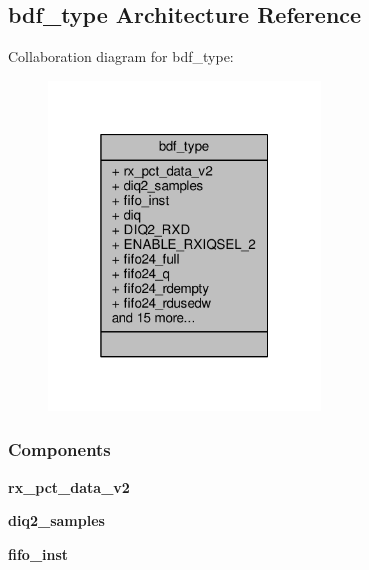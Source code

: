 \subsection{bdf\+\_\+type Architecture Reference}
\label{classLTE__rx__path_1_1bdf__type}


Collaboration diagram for bdf\+\_\+type\+:\nopagebreak
\begin{figure}[H]
\begin{center}
\leavevmode
\includegraphics[width=205pt]{d0/de7/classLTE__rx__path_1_1bdf__type__coll__graph}
\end{center}
\end{figure}
\subsubsection*{Components}
 \begin{DoxyCompactItemize}
\item 
{\bf rx\+\_\+pct\+\_\+data\+\_\+v2}  {\bfseries }  
\item 
{\bf diq2\+\_\+samples}  {\bfseries }  
\item 
{\bf fifo\+\_\+inst}  {\bfseries }  
\end{DoxyCompactItemize}
